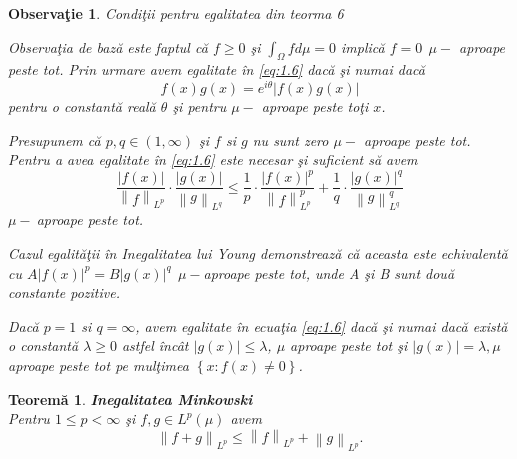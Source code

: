 \documentclass[a4paper,12pt,oneside]{report}
\newtheorem{theorem}{Teorem\u a}
\newtheorem{remark}{Observa\c{t}ie}
\begin{document}
\begin{remark}

Condi\c{t}ii pentru egalitatea din teorma 6

Observa\c{t}ia de baz\u{a} este faptul c\u{a}  \(f\geq 0\) \c{s}i \(\int_{\Omega }f d\mu  = 0\) implic\u{a} \(f = 0~~ \mu-\) aproape peste tot.
  Prin urmare avem egalitate \^{i}n \ref{eq:1.6} dac\u{a} \c{s}i numai dac\u{a}
\begin{displaymath}
  f\left ( x \right )g\left ( x \right ) = e^{i\theta }\left | f\left ( x \right ) g\left ( x \right )\right |
\end{displaymath}
pentru o constant\u{a} real\u{a} \(\theta\) \c{s}i pentru \(\mu-\) aproape peste to\c{t}i \(x\).


  Presupunem c\u{a} \(p , q \in \left ( 1 , \infty  \right )\) \c{s}i \(f\) si \(g\) nu sunt zero \(\mu-\) aproape peste tot. Pentru a avea egalitate \^{i}n \ref{eq:1.6} este necesar \c{s}i suficient s\u{a} avem
\begin{displaymath}
  \frac{\left | f\left ( x \right ) \right |}{\left \| f \right \|_{L^{p}}} \cdot \frac{\left | g\left ( x \right ) \right |}{\left \| g \right \|_{L^{q}}}\leq \frac{1}{p}\cdot \frac{\left | f\left ( x \right ) \right |^{p}}{\left \| f \right \|^{p}_{L^{p}}} + \frac{1}{q}\cdot \frac{\left | g\left ( x \right ) \right |^{q}}{\left \| g \right \|^{q}_{L^{q}}}
\end{displaymath}
\(\mu-~\)aproape peste tot.

\noindent Cazul egalit\u{a}\c{t}ii \^{i}n Inegalitatea lui Young demonstreaz\u{a} c\u{a} aceasta este echivalent\u{a} cu \(A\left | f\left ( x \right ) \right |^{p} = B\left | g\left ( x \right ) \right |^{q}~~ \mu-\)aproape peste tot,
unde A \c{s}i B sunt dou\u{a} constante pozitive.

  Dac\u{a} \(p = 1\) si \(q = \infty\), avem egalitate \^{i}n ecua\c{t}ia \ref{eq:1.6} dac\u{a} \c{s}i numai dac\u{a} exist\u{a} o constant\u{a} \(\lambda \geq 0\) astfel \^{i}nc\^{a}t \(\left | g\left ( x \right ) \right |\leq \lambda\),  \(\mu\) aproape peste tot \c{s}i \(\left | g\left ( x \right ) \right |= \lambda,  \mu\) aproape peste tot pe mul\c{t}imea \(\left \{ x : f\left ( x \right )\neq 0 \right \}\).
\end{remark}
\begin{theorem}
\textbf{Inegalitatea Minkowski}\\

Pentru \(1\leq  p < \infty\) \c{s}i \(f , g \in L^{p}\left ( \mu  \right ) \) avem
\begin{displaymath}
  \left \| f + g  \right \|_{L^{p}}\leq \left \| f \right \|_{L^{p}} + \left \| g \right \|_{L^{p}}. \label{eq:1.9} \tag{1.9}
\end{displaymath}
\end{theorem}
\end{document}
